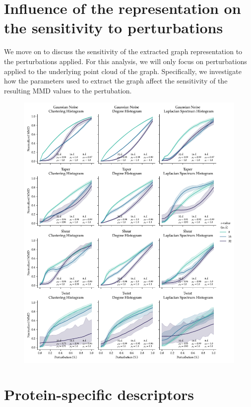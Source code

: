 
\section{Influence of the representation on the sensitivity to perturbations}

We move on to discuss the sensitivity of the extracted graph representation to
the perturbations applied. For this analysis, we will only focus on
perturbations applied to the underlying point cloud of the graph. Specifically,
we investigate how the parameters used to extract the graph affect the
sensitivity of the resulting MMD values to the pertubation.

\begin{figure}
  \includegraphics[width=\textwidth]{./figures/results/res_2.pdf}
\end{figure}

\section{Protein-specific descriptors}

